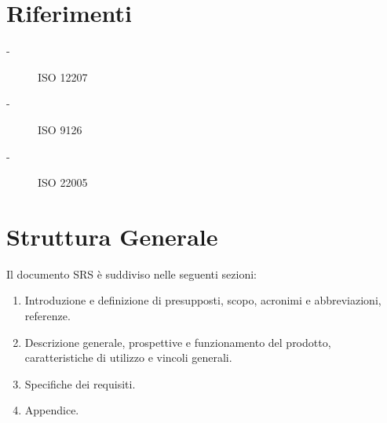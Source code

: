 \section{Riferimenti}
    \begin{description}
        \item [-] ISO 12207
        \item [-] ISO 9126
        \item [-] ISO 22005
    \end{description}

\section{Struttura Generale}
    Il documento SRS \`e suddiviso nelle seguenti sezioni:
    \begin{enumerate}
        \item Introduzione e definizione di presupposti, scopo, acronimi e 
            abbreviazioni, referenze.
        \item Descrizione generale, prospettive e funzionamento del prodotto, 
            caratteristiche di utilizzo e vincoli generali.
        \item Specifiche dei requisiti.
        \item Appendice.
    \end{enumerate}    
